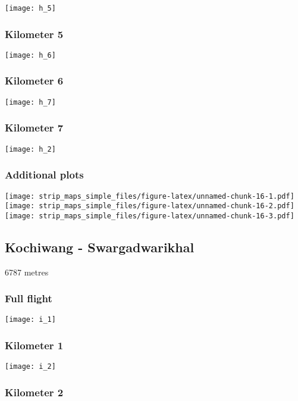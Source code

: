 \documentclass[]{article}
\begin{document}
\texttt{[image: h\_5]}

\subsubsection{Kilometer 5}\label{kilometer-5-7}

\texttt{[image: h\_6]}

\subsubsection{Kilometer 6}\label{kilometer-6-7}

\texttt{[image: h\_7]}

\subsubsection{Kilometer 7}\label{kilometer-7-6}

\texttt{[image: h\_2]}

\subsubsection{Additional plots}\label{additional-plots-7}

\texttt{[image: strip\_maps\_simple\_files/figure-latex/unnamed-chunk-16-1.pdf]}
\texttt{[image: strip\_maps\_simple\_files/figure-latex/unnamed-chunk-16-2.pdf]}
\texttt{[image: strip\_maps\_simple\_files/figure-latex/unnamed-chunk-16-3.pdf]}

\newpage

\subsection{Kochiwang -
Swargadwarikhal}\label{kochiwang---swargadwarikhal}

6787 metres

\subsubsection{Full flight}\label{full-flight-8}

\texttt{[image: i\_1]}

\subsubsection{Kilometer 1}\label{kilometer-1-8}

\texttt{[image: i\_2]}

\subsubsection{Kilometer 2}\label{kilometer-2-8}
\end{document}
